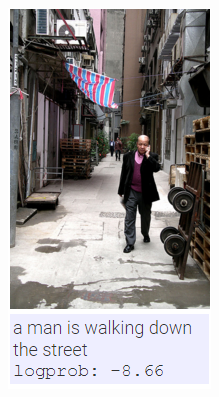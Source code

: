 \begin{figure}
\begin{subfigure}{.5\textwidth}
				\includegraphics[width=.8\linewidth]{Images/Results/Perfect/walking_down_the_street}
				\label{fig:perfectresults7}
			\end{subfigure}%
			\begin{subfigure}{.5\textwidth}
				\centering

\end{subfigure}
\end{figure}
